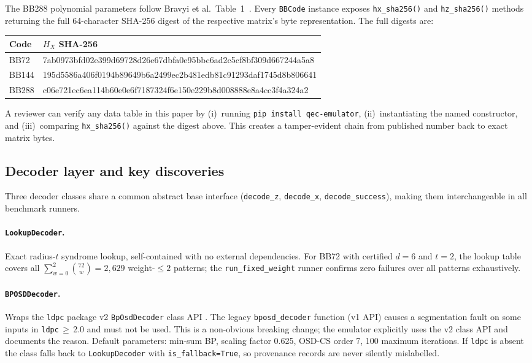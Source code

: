 \documentclass[11pt,a4paper]{article}
\begin{document}
\noindent
The BB288 polynomial parameters follow Bravyi et al.\ Table~1~\cite{Bravyi2024}.
Every \texttt{BBCode} instance exposes \texttt{hx\_sha256()} and
\texttt{hz\_sha256()} methods returning the full 64-character SHA-256
digest of the respective matrix's byte representation.
The full digests are:

\begin{center}
\small\ttfamily
\begin{tabular}{@{}ll@{}}
\toprule
Code & $H_X$ SHA-256 \\
\midrule
BB72  & 7ab0973bfd02e399d69728d26e67dbfa0e95bbc6ad2c5cf8bf309d667244a5a8 \\
BB144 & 195d5586a406f0194b89649b6a2499ec2b481edb81c91293daf1745d8b806641 \\
BB288 & c06e721ec6ea114b60e0e6f7187324f6e150e229b8d008888e8a4cc3f4a324a2 \\
\bottomrule
\end{tabular}
\end{center}

\noindent
A reviewer can verify any data table in this paper by (i)~running
\texttt{pip install qec-emulator}, (ii)~instantiating the named
constructor, and (iii)~comparing \texttt{hx\_sha256()} against the
digest above.
This creates a tamper-evident chain from published number back to
exact matrix bytes.

\subsection{Decoder layer and key discoveries}
\label{ssec:decoder-layer}

Three decoder classes share a common abstract base interface
(\texttt{decode\_z}, \texttt{decode\_x}, \texttt{decode\_success}),
making them interchangeable in all benchmark runners.

\paragraph{\texttt{LookupDecoder}.}
Exact radius-$t$ syndrome lookup, self-contained with no external
dependencies.
For BB72 with certified $d=6$ and $t=2$, the lookup table covers
all $\sum_{w=0}^{2}\binom{72}{w}=2{,}629$ weight-$\le2$ patterns;
the \texttt{run\_fixed\_weight} runner confirms zero failures over
all patterns exhaustively.

\paragraph{\texttt{BPOSDDecoder}.}
Wraps the \texttt{ldpc} package v2 \texttt{BpOsdDecoder} class API
\cite{ldpcPackage}.
The legacy \texttt{bposd\_decoder} function (v1 API) causes a
segmentation fault on some inputs in \texttt{ldpc}$\,\ge\,$2.0 and
must not be used.
This is a non-obvious breaking change; the emulator explicitly uses the
v2 class API and documents the reason.
Default parameters: min-sum BP, scaling factor 0.625, OSD-CS order 7,
100 maximum iterations.
If \texttt{ldpc} is absent the class falls back to \texttt{LookupDecoder}
with \texttt{is\_fallback=True}, so provenance records are never silently
mislabelled.
\end{document}
